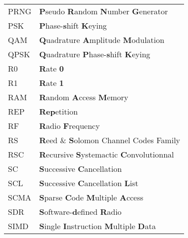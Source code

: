 \begin{center}
\begin{longtable}{ p{}  p{} }
		PRNG    & \textbf{P}seudo \textbf{R}andom \textbf{N}umber \textbf{G}enerator                                              \\
		PSK     & \textbf{P}hase-\textbf{s}hift \textbf{K}eying                                                                   \\
		QAM     & \textbf{Q}uadrature \textbf{A}mplitude \textbf{M}odulation                                                      \\
		QPSK    & \textbf{Q}uadrature \textbf{P}hase-\textbf{s}hift \textbf{K}eying                                               \\
		R0      & \textbf{R}ate \textbf{0}                                                                                        \\
		R1      & \textbf{R}ate \textbf{1}                                                                                        \\
		RAM     & \textbf{R}andom \textbf{A}ccess \textbf{M}emory                                                                 \\
		REP     & \textbf{Rep}etition                                                                                             \\
		RF      & \textbf{R}adio \textbf{F}requency                                                                               \\
		RS      & \textbf{R}eed \& \textbf{S}olomon Channel Codes Family                                                          \\
		RSC     & \textbf{R}ecursive \textbf{S}ystemactic \textbf{C}onvolutionnal                                                 \\
		SC      & \textbf{S}uccessive \textbf{C}ancellation                                                                       \\
		SCL     & \textbf{S}uccessive \textbf{C}ancellation \textbf{L}ist                                                         \\
		SCMA    & \textbf{S}parse \textbf{C}ode \textbf{M}ultiple \textbf{A}ccess                                                 \\
		SDR     & \textbf{S}oftware-\textbf{d}efined \textbf{R}adio                                                               \\
		SIMD    & \textbf{S}ingle \textbf{I}nstruction \textbf{M}ultiple \textbf{D}ata                                            \\

\end{longtable}
\end{center}

